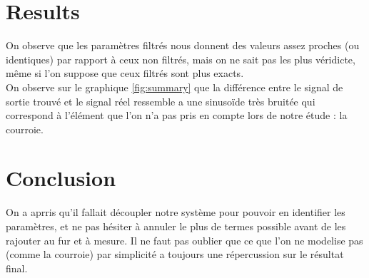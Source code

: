 \documentclass[10pt,a4paper,twocolumn]{article}
\begin{document}
\section*{Results}
On observe que les paramètres filtrés nous donnent des valeurs assez proches (ou identiques) par rapport à ceux non filtrés, mais on ne sait pas les plus véridicte, même si l'on suppose que ceux filtrés sont plus exacts.\\
On observe sur le graphique \ref{fig:summary} que la différence entre le signal de sortie trouvé et le signal réel ressemble a une sinusoïde très bruitée qui correspond à l'élément que l'on n'a pas pris en compte lors de notre étude : la courroie.

\section*{Conclusion}
On a aprris qu'il fallait découpler notre système pour pouvoir en identifier les paramètres, et ne pas hésiter à annuler le plus de termes possible avant de les rajouter au fur et à mesure. Il ne faut pas oublier que ce que l'on ne modelise pas (comme la courroie) par simplicité a toujours une répercussion sur le résultat final.

\balance
\end{document}

